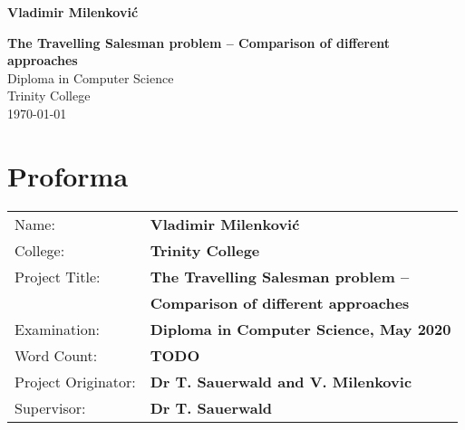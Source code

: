 \documentclass[12pt,twoside,notitlepage]{report}
\begin{document}





\pagestyle{empty}

\hfill{\LARGE \bf Vladimir Milenkovi\'c}

\vspace*{60mm}
\begin{center}
\Huge
{\bf The Travelling Salesman problem -- Comparison of different approaches } \\
\vspace*{5mm}
Diploma in Computer Science \\
\vspace*{5mm}
Trinity College \\
\vspace*{5mm}
\today  %
\end{center}

\cleardoublepage


\setcounter{page}{1}
\pagestyle{plain}

\chapter*{Proforma}

{\large
\begin{tabular}{ll}
Name:               & \bf Vladimir Milenkovi\'c                  \\
College:            & \bf Trinity College                    \\
Project Title:      & \bf The Travelling Salesman problem -- \\
& \bf Comparison of different approaches \\
Examination:        & \bf Diploma in Computer Science, May 2020        \\
Word Count:         & \bf TODO\footnotemark[1] \\
Project Originator: & \bf Dr T. Sauerwald and V. Milenkovic                    \\
Supervisor:         & \bf Dr T. Sauerwald                    \\ 
\end{tabular}
}
\end{document}
